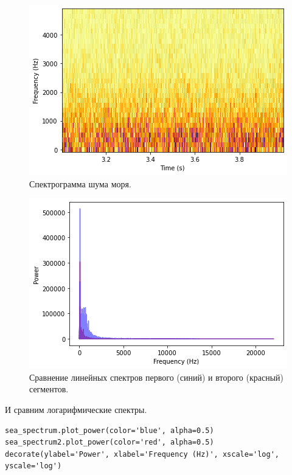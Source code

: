 \documentclass[a4paper, 14pt]{extarticle}
\begin{document}
    \begin{figure}[H]
        \centering
        \includegraphics[width=0.8\linewidth]{resources/Images/task1_sea_spectrogram}
        \caption{Спектрограмма шума моря.}
        \label{fig:task1_sea_spectrogram}
    \end{figure}

    \begin{figure}[H]
        \centering
        \includegraphics[width=0.8\linewidth]{resources/Images/task1_sea_spectrum_lin_compare}
        \caption{Сравнение линейных спектров первого (синий) и второго (красный) сегментов.}
        \label{fig:task1_sea_spectrum_lin_compare}
    \end{figure}

    И сравним логарифмические спектры.

    \begin{lstlisting}[caption= Сравнение логарифмических спектров двух сегментов., label={lst:task1_sea_spectrum_log_compare}]
sea_spectrum.plot_power(color='blue', alpha=0.5)
sea_spectrum2.plot_power(color='red', alpha=0.5)
decorate(ylabel='Power', xlabel='Frequency (Hz)', xscale='log', yscale='log')   \end{lstlisting}
\end{document}
